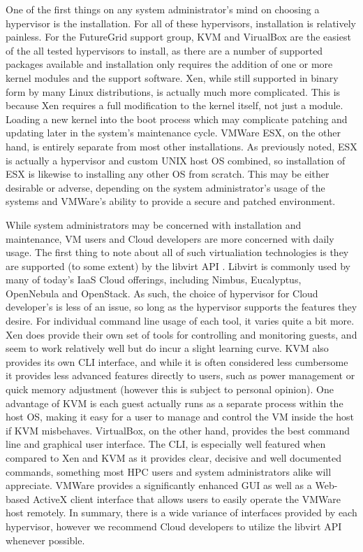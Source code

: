 One of the first things on any system administrator's mind on choosing a hypervisor is the installation.  For all of these hypervisors, installation is relatively painless.  For the FutureGrid support group, KVM and VirualBox are the easiest of the all tested hypervisors to install, as there are a number of supported packages available and installation only requires the addition of one or more kernel modules and the support software.  Xen, while still supported in binary form by many Linux distributions, is actually much more complicated.  This is because Xen requires a full modification to the kernel itself, not just a module.  Loading a new kernel into the boot process which may complicate patching and updating later in the system's maintenance cycle.  VMWare ESX, on the other hand, is entirely separate from most other installations.  As previously noted, ESX is actually a hypervisor and custom UNIX host OS combined, so installation of ESX is likewise to installing any other OS from scratch.  This may be either desirable or adverse, depending on the system administrator's usage of the systems and VMWare's ability to provide a secure and patched environment.

While system administrators may be concerned with installation and maintenance, VM users and Cloud developers are more concerned with daily usage. The first thing to note about all of such virtualiation technologies is they are supported (to some extent) by the libvirt API \cite{Bolte2010}.  Libvirt is commonly used by many of today's IaaS Cloud offerings, including Nimbus, Eucalyptus, OpenNebula and OpenStack.  As such, the choice of hypervisor for Cloud developer's is less of an issue, so long as the hypervisor supports the features they desire.  For individual command line usage of each tool, it varies quite a bit more.  Xen does provide their own set of tools for controlling and monitoring guests, and seem to work relatively well but do incur a slight learning curve.  KVM also provides its own CLI interface, and while it is often considered less cumbersome it provides less advanced features directly to users, such as power management or quick memory adjustment (however this is subject to personal opinion).  One advantage of KVM is each guest actually runs as a separate process within the host OS, making it easy for a user to manage and control the VM inside the host if KVM misbehaves.  VirtualBox, on the other hand, provides the best command line and graphical user interface.  The CLI, is especially well featured when compared to Xen and KVM as it provides clear, decisive and well documented commands, something most HPC users and system administrators alike will appreciate.  VMWare provides a significantly enhanced GUI as well as a Web-based ActiveX client interface that allows users to easily operate the VMWare host remotely.  In summary, there is a wide variance of interfaces provided by each hypervisor, however we recommend Cloud developers to utilize the libvirt API whenever possible.  


